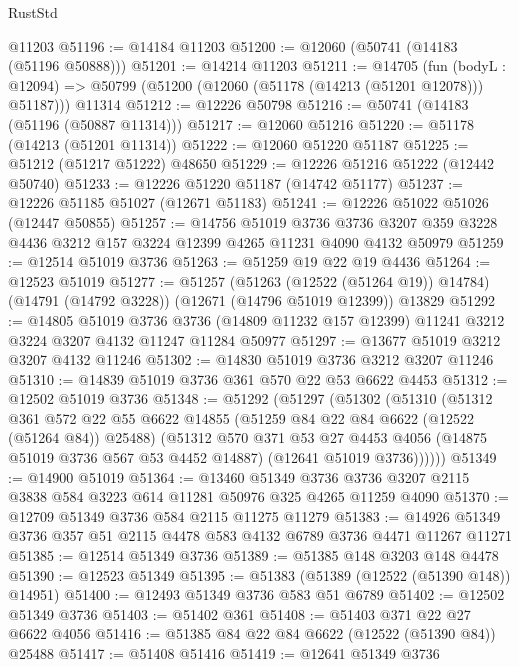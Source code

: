 \begin{lexlean}{RustStd}
\begin{coremodule}
    @11203
@51196 := @14184 @11203
@51200 := @12060 (@50741 (@14183 (@51196 @50888)))
@51201 := @14214 @11203
@51211 := @14705
    (fun (bodyL : @12094) => @50799 (@51200 (@12060 (@51178 (@14213 (@51201 @12078))) @51187)))
    @11314
@51212 := @12226 @50798
@51216 := @50741 (@14183 (@51196 (@50887 @11314)))
@51217 := @12060 @51216
@51220 := @51178 (@14213 (@51201 @11314))
@51222 := @12060 @51220 @51187
@51225 := @51212 (@51217 @51222) @48650
@51229 := @12226 @51216 @51222 (@12442 @50740)
@51233 := @12226 @51220 @51187 (@14742 @51177)
@51237 := @12226 @51185 @51027 (@12671 @51183)
@51241 := @12226 @51022 @51026 (@12447 @50855)
@51257 := @14756
    @51019
    @3736
    @3736
    @3207
    @359
    @3228
    @4436
    @3212
    @157
    @3224
    @12399
    @4265
    @11231
    @4090
    @4132
    @50979
@51259 := @12514 @51019 @3736
@51263 := @51259 @19 @22 @19 @4436
@51264 := @12523 @51019
@51277 := @51257
    (@51263 (@12522 (@51264 @19)) @14784)
    (@14791 (@14792 @3228))
    (@12671 (@14796 @51019 @12399))
    @13829
@51292 := @14805
    @51019
    @3736
    @3736
    (@14809 @11232 @157 @12399)
    @11241
    @3212
    @3224
    @3207
    @4132
    @11247
    @11284
    @50977
@51297 := @13677 @51019 @3212 @3207 @4132 @11246
@51302 := @14830 @51019 @3736 @3212 @3207 @11246
@51310 := @14839 @51019 @3736 @361 @570 @22 @53 @6622 @4453
@51312 := @12502 @51019 @3736
@51348 := @51292
    (@51297
      (@51302
        (@51310
          (@51312
            @361
            @572
            @22
            @55
            @6622
            @14855
            (@51259 @84 @22 @84 @6622 (@12522 (@51264 @84)) @25488)
            (@51312
              @570
              @371
              @53
              @27
              @4453
              @4056
              (@14875 @51019 @3736 @567 @53 @4452 @14887)
              (@12641 @51019 @3736))))))
@51349 := @14900 @51019
@51364 := @13460
    @51349
    @3736
    @3736
    @3207
    @2115
    @3838
    @584
    @3223
    @614
    @11281
    @50976
    @325
    @4265
    @11259
    @4090
@51370 := @12709 @51349 @3736 @584 @2115 @11275 @11279
@51383 := @14926 @51349 @3736 @357 @51 @2115 @4478 @583 @4132 @6789 @3736 @4471 @11267 @11271
@51385 := @12514 @51349 @3736
@51389 := @51385 @148 @3203 @148 @4478
@51390 := @12523 @51349
@51395 := @51383 (@51389 (@12522 (@51390 @148)) @14951)
@51400 := @12493 @51349 @3736 @583 @51 @6789
@51402 := @12502 @51349 @3736
@51403 := @51402 @361
@51408 := @51403 @371 @22 @27 @6622 @4056
@51416 := @51385 @84 @22 @84 @6622 (@12522 (@51390 @84)) @25488
@51417 := @51408 @51416
@51419 := @12641 @51349 @3736

\end{coremodule}
\end{lexlean}
